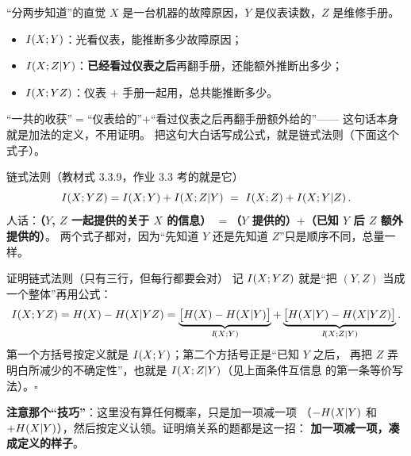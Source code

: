 \begin{idea}{“分两步知道”的直觉}
$X$ 是一台机器的故障原因，$Y$ 是仪表读数，$Z$ 是维修手册。
\begin{itemize}[leftmargin=1.4em,itemsep=1pt,topsep=1pt]
  \item $I\!\left(X;Y\right)$：光看仪表，能推断多少故障原因；
  \item $I\!\left(X;Z|Y\right)$：\textbf{已经看过仪表之后}再翻手册，还能额外推断出多少；
  \item $I\!\left(X;YZ\right)$：仪表 $+$ 手册一起用，总共能推断多少。
\end{itemize}
“一共的收获”$=$“仪表给的”$+$“看过仪表之后再翻手册额外给的”——
这句话本身就是加法的定义，不用证明。
把这句大白话写成公式，就是链式法则（下面这个式子）。
\end{idea}

\begin{defbox}{链式法则（教材式 3.3.9，作业 3.3 考的就是它）}
\[
\I{X;YZ}=\I{X;Y}+\I{X;Z|Y}\ =\ \I{X;Z}+\I{X;Y|Z}.
\]
人话：\textbf{（$Y$, $Z$ 一起提供的关于 $X$ 的信息）
$=$（$Y$ 提供的）$+$（已知 $Y$ 后 $Z$ 额外提供的）}。
两个式子都对，因为“先知道 $Y$ 还是先知道 $Z$”只是顺序不同，总量一样。
\end{defbox}

\begin{calc}{证明链式法则（只有三行，但每行都要会对）}
记 $I\!\left(X;YZ\right)$ 就是“把 $(Y,Z)$ 当成一个整体”再用公式：
\[
\I{X;YZ}=\Hx{X}-\Hx{X|YZ}
=\underbrace{\bigl[\Hx{X}-\Hx{X|Y}\bigr]}_{\I{X;Y}}
+\underbrace{\bigl[\Hx{X|Y}-\Hx{X|YZ}\bigr]}_{\I{X;Z|Y}} .
\]
第一个方括号按定义就是 $I\!\left(X;Y\right)$；第二个方括号正是“已知 $Y$ 之后，
再把 $Z$ 弄明白所减少的不确定性”，也就是 $I\!\left(X;Z|Y\right)$（见上面条件互信息
的第一条等价写法）。$\square$

\textbf{注意那个“技巧”}：这里没有算任何概率，只是加一项减一项
（$-H\!\left(X|Y\right)$ 和 $+H\!\left(X|Y\right)$），然后按定义认领。证明熵关系的题都是这一招：
\textbf{加一项减一项，凑成定义的样子}。
\end{calc}

